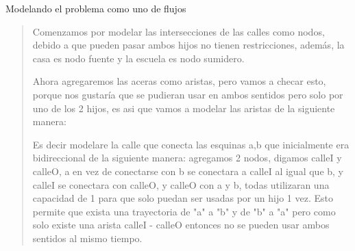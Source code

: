 \textcolor{bibi}{Modelando el problema como uno de flujos}
\begin{quote}
    Comenzamos por modelar las intersecciones de las calles como nodos, debido a que pueden pasar ambos hijos no tienen restricciones, además, la casa es nodo fuente y la escuela es nodo sumidero.  \vspace{.2cm} 

    Ahora agregaremos las aceras como aristas, pero vamos a checar esto, porque nos gustaría que se pudieran usar en ambos sentidos pero solo por uno de los 2 hijos, es asi que vamos a modelar las aristas de la siguiente manera: \vspace{.2cm}
    \begin{center}
        \begin{figure}[H]
            \centering
            \label{fig:ej12}
        \end{figure}
    \end{center}

    Es decir modelare la calle que conecta las esquinas a,b que inicialmente era bidireccional de la siguiente manera: agregamos 2 nodos, digamos calleI y calleO, a en vez de conectarse con b se conectara a calleI al igual que b, y calleI se conectara con calleO, y calleO con a y b, todas utilizaran una capacidad de 1 para que solo puedan ser usadas por un hijo 1 vez. Esto permite que exista una trayectoria de "a" a "b" y de "b" a "a" pero como solo existe una arista calleI - calleO entonces no se pueden usar ambos sentidos al mismo tiempo. \vspace{.2cm}


\end{quote}
